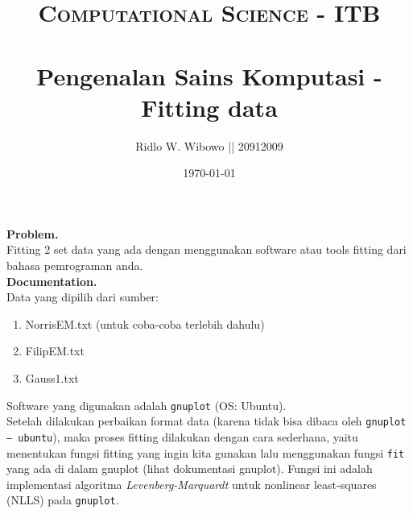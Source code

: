 \documentclass[paper=a4, fontsize=11pt]{scrartcl}
\title{	
\normalfont \normalsize 
\textsc{Computational Science - ITB} \\ [25pt] %
\horrule{0.5pt} \\[0.4cm] %
\small  Pengenalan Sains Komputasi - Fitting data\\ %
}
\author{\small{Ridlo W. Wibowo || 20912009}} %
\date{\normalsize\today} %
\numberwithin{equation}{section} %
\numberwithin{figure}{section} %
\numberwithin{table}{section} %
\begin{document}
\maketitle %

\large \textbf{Problem.}\\
Fitting 2 set data yang ada dengan menggunakan software atau tools fitting dari bahasa pemrograman anda.\\

\large \textbf{Documentation.}\\
Data yang dipilih dari sumber:
\begin{enumerate}
\item NorrisEM.txt (untuk coba-coba terlebih dahulu)
\item FilipEM.txt
\item Gauss1.txt
\end{enumerate}
Software yang digunakan adalah \texttt{gnuplot} (OS: Ubuntu).\\

Setelah dilakukan perbaikan format data (karena tidak bisa dibaca oleh \texttt{gnuplot -- ubuntu}), maka proses fitting dilakukan dengan cara sederhana, yaitu menentukan fungsi fitting yang ingin kita gunakan lalu menggunakan fungsi \texttt{fit} yang ada di dalam gnuplot (lihat dokumentasi gnuplot). Fungsi ini adalah implementasi algoritma \textit{Levenberg-Marquardt} untuk nonlinear least-squares (NLLS) pada \texttt{gnuplot}.\\
\end{document}
